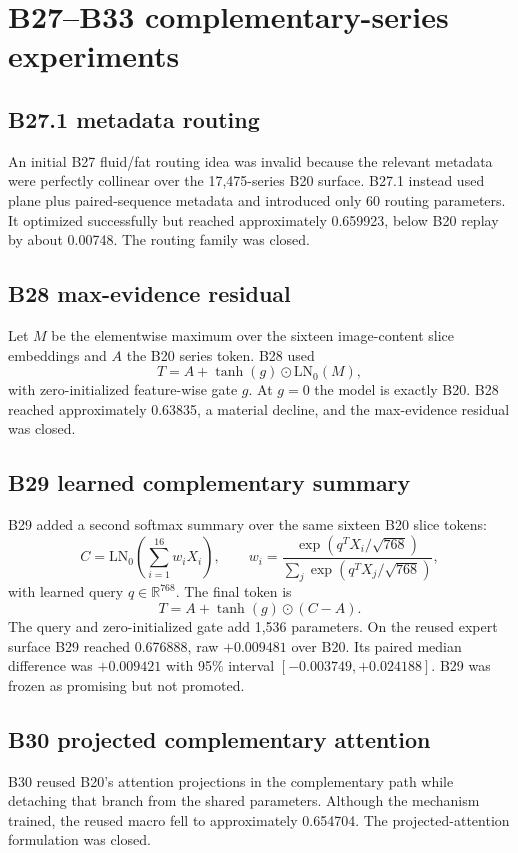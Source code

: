 \documentclass[preprint,12pt]{elsarticle}
\newcommand{\R}{\mathbb{R}}
\newcommand{\LNzero}{\mathrm{LN}_0}
\begin{document}
\section{B27--B33 complementary-series experiments}
\label{sec:b27b33}

\subsection{B27.1 metadata routing}
An initial B27 fluid/fat routing idea was invalid because the relevant metadata were perfectly collinear over the 17,475-series B20 surface. B27.1 instead used plane plus paired-sequence metadata and introduced only 60 routing parameters. It optimized successfully but reached approximately 0.659923, below B20 replay by about 0.00748. The routing family was closed.

\subsection{B28 max-evidence residual}
Let $M$ be the elementwise maximum over the sixteen image-content slice embeddings and $A$ the B20 series token. B28 used
\begin{equation}
T=A+\tanh(g)\odot\LNzero(M),
\end{equation}
with zero-initialized feature-wise gate $g$. At $g=0$ the model is exactly B20. B28 reached approximately 0.63835, a material decline, and the max-evidence residual was closed.

\subsection{B29 learned complementary summary}
B29 added a second softmax summary over the same sixteen B20 slice tokens:
\begin{equation}
C=\LNzero\!\left(\sum_{i=1}^{16}w_iX_i\right),\qquad
w_i=\frac{\exp(q^TX_i/\sqrt{768})}{\sum_j\exp(q^TX_j/\sqrt{768})},
\end{equation}
with learned query $q\in\R^{768}$. The final token is
\begin{equation}
T=A+\tanh(g)\odot(C-A).
\label{eq:b29}
\end{equation}
The query and zero-initialized gate add 1,536 parameters. On the reused expert surface B29 reached 0.676888, raw $+0.009481$ over B20. Its paired median difference was $+0.009421$ with 95\% interval $[-0.003749,+0.024188]$. B29 was frozen as promising but not promoted.

\subsection{B30 projected complementary attention}
B30 reused B20's attention projections in the complementary path while detaching that branch from the shared parameters. Although the mechanism trained, the reused macro fell to approximately 0.654704. The projected-attention formulation was closed.
\end{document}

